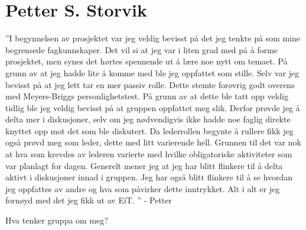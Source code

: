 \section{Petter S. Storvik}
''I begynnelsen av prosjektet var jeg veldig bevisst på det jeg tenkte på som mine begrensede fagkunnskaper. 
Det vil si at jeg var i liten grad med på å forme prosjektet, men synes det hørtes spennende ut å lære noe nytt om temaet. 
På grunn av at jeg hadde lite å komme med ble jeg oppfattet som stille. 
Selv var jeg bevisst på at jeg lett tar en mer passiv rolle. 
Dette stemte forøvrig godt overens med Meyers-Briggs personlighetstest. 
På grunn av at dette ble tatt opp veldig tidlig ble jeg veldig bevisst på at gruppen oppfattet meg slik. 
Derfor prøvde jeg å delta mer i diskusjoner, selv om jeg nødvendigvis ikke hadde noe faglig direkte knyttet opp mot det som ble diskutert. 
Da lederrollen begynte å rullere fikk jeg også prøvd meg som leder, dette med litt varierende hell. 
Grunnen til det var nok at hva som krevdes av lederen varierte med hvilke obligatoriske aktiviteter som var planlagt for dagen. 
Generelt mener jeg at jeg har blitt flinkere til å delta aktivt i diskusjoner innad i gruppen. 
Jeg har også blitt flinkere til å se hvordan jeg oppfattes av andre og hva som påvirker dette inntrykket. 
Alt i alt er jeg fornøyd med det jeg fikk ut av EiT. '' \hfill - Petter
\vspace{\secspace}

Hva tenker gruppa om meg? 


